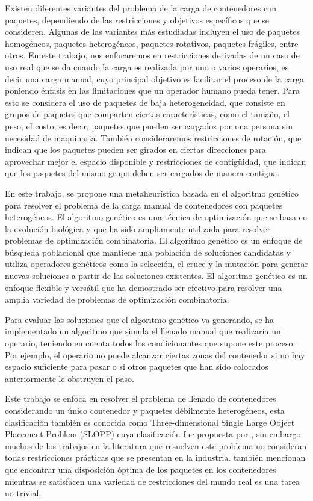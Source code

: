 \documentclass[openany]{article}
\begin{document}
Existen diferentes variantes del problema de la carga de contenedores con paquetes, dependiendo de las restricciones y objetivos específicos que se consideren. Algunas de las variantes más estudiadas incluyen el uso de paquetes homogéneos, paquetes heterogéneos, paquetes rotativos, paquetes frágiles, entre otros. En este trabajo, nos enfocaremos en restricciones derivadas de un caso de uso real que se da cuando la carga es realizada por uno o varios operarios, es decir una carga manual, cuyo principal objetivo es facilitar el proceso de la carga poniendo énfasis en las limitaciones que un operador humano pueda tener. Para esto se considera el uso de paquetes de baja heterogeneidad, que consiste en grupos de paquetes que comparten ciertas características, como el tamaño, el peso, el costo, es decir, paquetes que pueden ser cargados por una persona sin necesidad de maquinaria. También consideraremos restricciones de rotación, que indican que los paquetes pueden ser girados en ciertas direcciones para aprovechar mejor el espacio disponible y restricciones de contigüidad, que indican que los paquetes del mismo grupo deben ser cargados de manera contigua.

En este trabajo, se propone una metaheurística basada en el algoritmo genético para resolver el problema de la carga manual de contenedores con paquetes heterogéneos. El algoritmo genético es una técnica de optimización que se basa en la evolución biológica y que ha sido ampliamente utilizada para resolver problemas de optimización combinatoria. El algoritmo genético es un enfoque de búsqueda poblacional que mantiene una población de soluciones candidatas y utiliza operadores genéticos como la selección, el cruce y la mutación para generar nuevas soluciones a partir de las soluciones existentes. El algoritmo genético es un enfoque flexible y versátil que ha demostrado ser efectivo para resolver una amplia variedad de problemas de optimización combinatoria.

Para evaluar las soluciones que el algoritmo genético va generando, se ha implementado un algoritmo que simula el llenado manual que realizaría un operario, teniendo en cuenta todos los condicionantes que supone este proceso. Por ejemplo, el operario no puede alcanzar ciertas zonas del contenedor si no hay espacio suficiente para pasar o si otros paquetes que han sido colocados anteriormente le obstruyen el paso.

Este trabajo se enfoca en resolver el problema de llenado de contenedores considerando un único contenedor y paquetes débilmente heterogéneos, esta clasificación también es conocida como Three-dimensional Single Large Object Placement Problem (SLOPP) cuya clasificación fue propuesta por \textcite{WASCHER20071109}, sin embargo muchos de los trabajos en la literatura que resuelven este problema no consideran todas restricciones prácticas que se presentan en la industria. \parencite{SAFAK2023106199} también mencionan que encontrar una disposición óptima de los paquetes en los contenedores mientras se satisfacen una variedad de restricciones del mundo real es una tarea no trivial.
\end{document}
